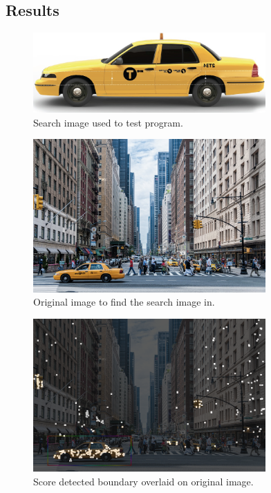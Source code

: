 \documentclass[10pt, journal]{vgtc}                %
\begin{document}
\subsection{Results}


\begin{figure}[h!]
	\centering
	\includegraphics[width=3.5in]{taxi_cab.png}
	\caption{Search image used to test program.}
\end{figure}

\begin{figure}[h!]
	\centering
	\includegraphics[width=3.5in]{nyc_streets.png}
	\caption{Original image to find the search image in.}
\end{figure}


\begin{figure}[h!]
	\centering
	\includegraphics[width=3.5in]{overlay_taxi.png}
	\caption{Score detected boundary overlaid on original image.}
\end{figure}
\end{document}
